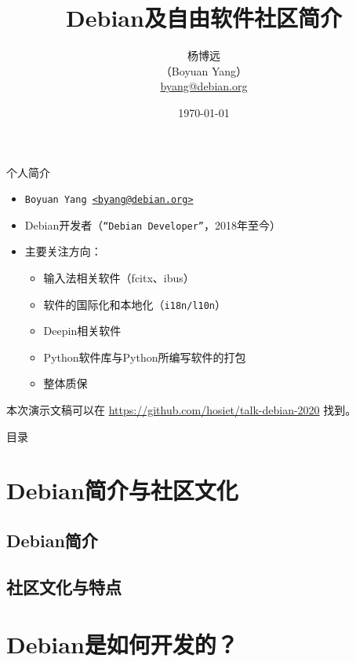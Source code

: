 \documentclass[aspectratio=169]{beamer}
\title[Intro to Debian and FLOSS community]{Debian及自由软件社区简介}
\author[@byang/@hosiet]{杨博远 \\ （Boyuan Yang） \\ \href{mailto:byang@debian.org}{byang@debian.org} }
\institute[Debian]{Debian Project}
\date{\today}
\begin{document}
	
\begin{frame}
\titlepage
\end{frame}

\begin{frame}{个人简介}
	\begin{itemize}
		\item \texttt{Boyuan Yang \href{mailto:byang@debian.org}{<byang@debian.org>}}
		\item Debian开发者（\texttt{“Debian Developer”}，2018年至今）
		\item 主要关注方向： \\
		\begin{itemize}
			\item 输入法相关软件（fcitx、ibus）
			\item 软件的国际化和本地化（\texttt{i18n/l10n}）
			\item Deepin相关软件
			\item Python软件库与Python所编写软件的打包
			\item 整体质保
		\end{itemize}
	\end{itemize}
    \vfill
    本次演示文稿可以在 \url{https://github.com/hosiet/talk-debian-2020} 找到。
\end{frame}


\begin{frame}{目录}
\tableofcontents
\end{frame}



\section{Debian简介与社区文化}

\subsection{Debian简介}


\subsection{社区文化与特点}




\section{Debian是如何开发的？}
\end{document}
